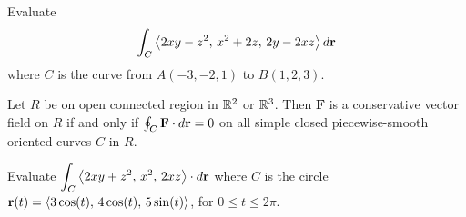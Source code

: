 \documentclass[mathNotesPreamble]{subfiles}
\begin{document}
  \begin{ex*}
    Evaluate
      \[\int_C {\left\langle 2xy-z^2,\, x^2+2z,\,2y-2xz \right\rangle}\,d{\mathbf{r}}\]
    where $C$ is the curve from $A(-3,-2,1)$ to $B(1,2,3)$.
  \end{ex*}
  \pagebreak

  \begin{thmBox*}
    Let $R$ be on open connected region in $\mathbb{R}^2$ or $\mathbb{R}^3$. Then $\mathbf F$ is a conservative vector field on $R$ if and only if $\oint_C \mathbf F\cdot d{\mathbf{r}}=0$ on all simple closed piecewise-smooth oriented curves $C$ in $R$.
  \end{thmBox*}

  \begin{ex*}
    Evaluate $\displaystyle \int_C {\left\langle 2xy+z^2,\,x^2,\,2xz \right\rangle}\cdot d{\mathbf{r}}$ where $C$ is the circle \newline${\mathbf{r}}(t)={\left\langle 3\cos(t),\,4\cos(t),\,5\sin(t) \right\rangle}$, for $0\leq t\leq 2\pi$.
  \end{ex*}

  \pagebreak
  
\end{document}
